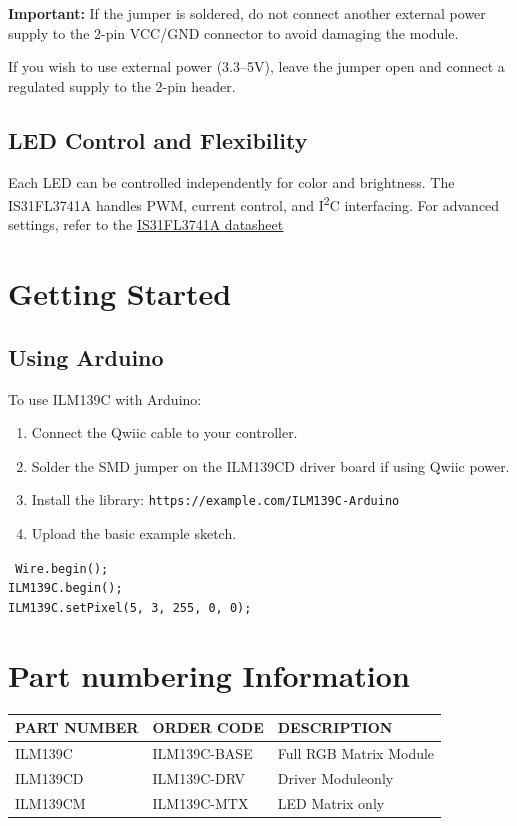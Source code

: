 \documentclass[10pt]{article}
\newcommand{\sectionbreak}{\clearpage}
\begin{document}
	\textbf{Important:} If the jumper is soldered, do not connect another external power supply to the 2-pin VCC/GND connector to avoid damaging the module.
	
	If you wish to use external power (3.3–5V), leave the jumper open and connect a regulated supply to the 2-pin header.
	
	\subsection{LED Control and Flexibility}
	Each LED can be controlled independently for color and brightness. The IS31FL3741A handles PWM, current control, and I\textsuperscript{2}C interfacing. For advanced settings, refer to the \underline{\href{https://www.lumissil.com/assets/pdf/core/IS31FL3741A_DS.pdf}{IS31FL3741A datasheet}}
	
	\sectionbreak
	
	\section{Getting Started}\label{sec:getting}
	\subsection{Using Arduino}
	To use ILM139C with Arduino:
	
	\begin{enumerate}
		\item Connect the Qwiic cable to your controller.
		\item Solder the SMD jumper on the ILM139CD driver board if using Qwiic power.
		\item Install the library: \texttt{https://example.com/ILM139C-Arduino}
		\item Upload the basic example sketch.
	\end{enumerate}
	
	\texttt{
		Wire.begin(); \\
		ILM139C.begin(); \\
		ILM139C.setPixel(5, 3, 255, 0, 0);
	}
	
	\sectionbreak
	
	\section{Part numbering Information}\label{sec:order}
	\begin{tabularx}{\textwidth}{|X|X|X|}
		\hline
		\rowcolor{gray!25}\textbf{PART NUMBER} & \textbf{ORDER CODE} & \textbf{DESCRIPTION} \\ \hline
		ILM139C & ILM139C-BASE & Full RGB Matrix Module \\ \hline
		ILM139CD & ILM139C-DRV & Driver Moduleonly \\ \hline
		ILM139CM & ILM139C-MTX & LED Matrix only \\ \hline
	\end{tabularx}
	\label{tab:order}
	
\end{document}

